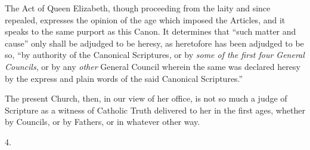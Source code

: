 The Act of Queen Elizabeth, though proceeding from the laity and
since repealed, expresses the opinion of the age which imposed the
Articles, and it speaks to the same purport as this Canon. It
determines that ``such matter and cause'' only shall be
adjudged to be heresy, as heretofore has been adjudged to be so,
``by authority of the Canonical Scriptures, or by \emph{some of the
first four General Councils}, or by any \emph{other} General
Council wherein the same was declared heresy by the express and plain
words of the said Canonical Scriptures.''

The present Church, then, in our view of her office, is not so much
a judge of Scripture as a witness of Catholic Truth delivered to her
in the first ages, whether by Councils, or by Fathers, or in whatever
other way.

4.

